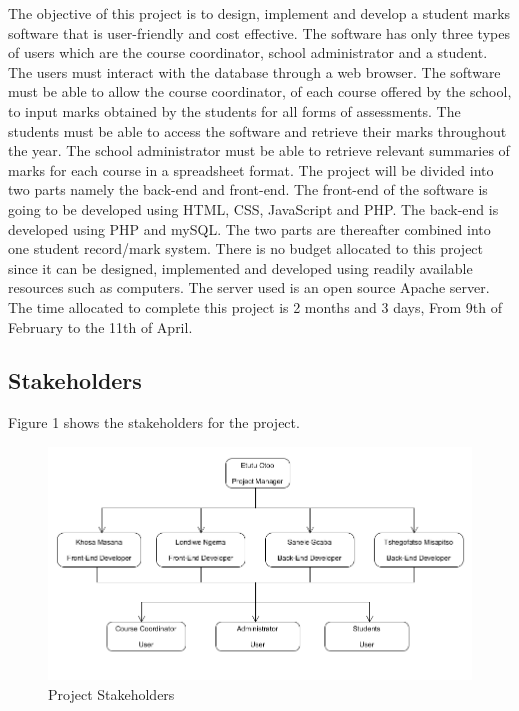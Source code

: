 \documentclass[10pt,onecolumn]{MainDocument}
\begin{document}
The objective of this project is to design, implement and develop a student marks software that is user-friendly and cost effective. The software has only three types of users which are the course coordinator, school administrator and a student. The users must interact with the database through a web browser. The software must be able to allow the course coordinator, of each course offered by the school, to input marks obtained by the students for all forms of assessments. The students must be able to access the software and retrieve their marks throughout the year. The school administrator must be able to retrieve relevant summaries of marks for each course in a spreadsheet format. The project will be divided into two parts namely the back-end and front-end. The front-end of the software is going to be developed using HTML, CSS, JavaScript and PHP. The back-end is developed using PHP and mySQL. The two parts are thereafter combined into one student record/mark system. There is no budget allocated to this project since it can be designed, implemented and developed using readily available resources such as computers. The server used is an open source Apache server. The time allocated to complete this project is 2 months and 3 days, From 9th of February to the 11th of April. 

\subsection{Stakeholders}

Figure 1 shows the stakeholders for the project. 


\begin{figure}[h]
\begin{center}
\includegraphics[scale=0.70]{stakeholders}
\caption{Project Stakeholders}
\end{center}
\end{figure}
\end{document}
